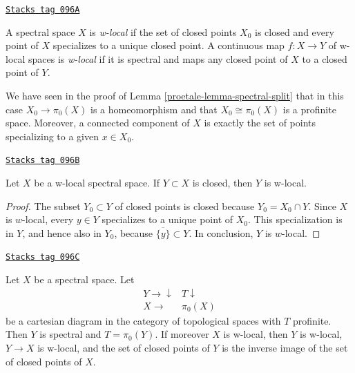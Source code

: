 \begin{definition}[W local]
\label{proetale-definition-w-local}
\href{https://stacks.math.columbia.edu/tag/096A}{\texttt{Stacks tag 096A}}

A spectral space $X$ is {\it w-local} if the set of closed points $X_0$
is closed and every point of $X$ specializes to a unique closed point.
A continuous map $f : X \to Y$ of w-local spaces is {\it w-local}
if it is spectral and maps any closed point of $X$ to a closed point of $Y$.
\end{definition}

We have seen in the proof of Lemma \ref{proetale-lemma-spectral-split}
that in this case $X_0 \to \pi_0(X)$ is a homeomorphism and that
$X_0 \cong \pi_0(X)$ is a profinite space. Moreover, a connected
component of $X$ is exactly the set of points specializing to
a given $x \in X_0$.

\begin{lemma}
\label{proetale-lemma-closed-subspace-w-local}
\href{https://stacks.math.columbia.edu/tag/096B}{\texttt{Stacks tag 096B}}

Let $X$ be a w-local spectral space. If $Y \subset X$ is closed,
then $Y$ is w-local.
\end{lemma}

\begin{proof}
The subset $Y_0 \subset Y$ of closed points is closed because
$Y_0 = X_0 \cap Y$. Since $X$ is $w$-local, every $y \in Y$ specializes
to a unique point of $X_0$. This specialization is in $Y$, and hence
also in $Y_0$, because $\overline{\{y\}}\subset Y$. In conclusion, $Y$
is $w$-local.
\end{proof}

\begin{lemma}[Silly]
\label{proetale-lemma-silly}
\href{https://stacks.math.columbia.edu/tag/096C}{\texttt{Stacks tag 096C}}

Let $X$ be a spectral space. Let
$$
\begin{array}{cc}Y \longrightarrow\downarrow & T \downarrow \\ X \longrightarrow & \pi_0(X)\end{array}
$$
be a cartesian diagram in the category of topological spaces
with $T$ profinite. Then $Y$ is spectral and $T = \pi_0(Y)$.
If moreover $X$ is w-local, then $Y$ is w-local, $Y \to X$ is w-local,
and the set of closed points of $Y$ is the inverse image of the
set of closed points of $X$.
\end{lemma}

